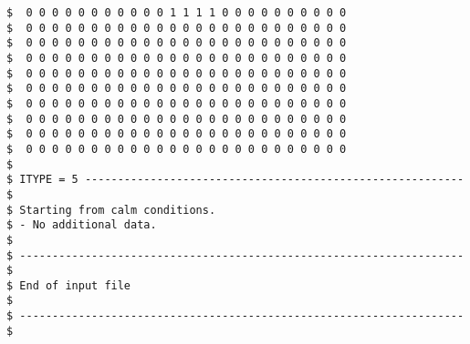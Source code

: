 \begin{footnotesize}
\begin{verbatim}
$  0 0 0 0 0 0 0 0 0 0 0 1 1 1 1 0 0 0 0 0 0 0 0 0 0
$  0 0 0 0 0 0 0 0 0 0 0 0 0 0 0 0 0 0 0 0 0 0 0 0 0
$  0 0 0 0 0 0 0 0 0 0 0 0 0 0 0 0 0 0 0 0 0 0 0 0 0
$  0 0 0 0 0 0 0 0 0 0 0 0 0 0 0 0 0 0 0 0 0 0 0 0 0
$  0 0 0 0 0 0 0 0 0 0 0 0 0 0 0 0 0 0 0 0 0 0 0 0 0
$  0 0 0 0 0 0 0 0 0 0 0 0 0 0 0 0 0 0 0 0 0 0 0 0 0
$  0 0 0 0 0 0 0 0 0 0 0 0 0 0 0 0 0 0 0 0 0 0 0 0 0
$  0 0 0 0 0 0 0 0 0 0 0 0 0 0 0 0 0 0 0 0 0 0 0 0 0
$  0 0 0 0 0 0 0 0 0 0 0 0 0 0 0 0 0 0 0 0 0 0 0 0 0
$  0 0 0 0 0 0 0 0 0 0 0 0 0 0 0 0 0 0 0 0 0 0 0 0 0
$
$ ITYPE = 5 ---------------------------------------------------------- $
$ Starting from calm conditions.
$ - No additional data.
$
$ -------------------------------------------------------------------- $
$ End of input file                                                    $
$ -------------------------------------------------------------------- $
\end{verbatim}
\end{footnotesize}
